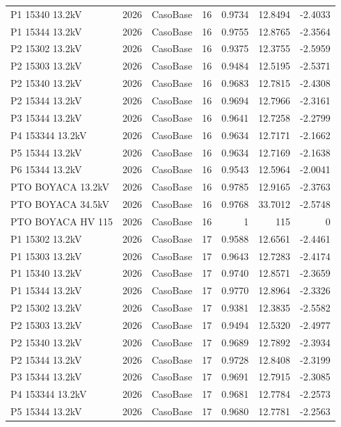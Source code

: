 \documentclass[11pt,a4paper]{article}
\begin{document}
\begin{longtable}{llllrrr}
P1 15340 13.2kV & 2026 & CasoBase & 16 & 0.9734 & 12.8494 & -2.4033 \\
P1 15344 13.2kV & 2026 & CasoBase & 16 & 0.9755 & 12.8765 & -2.3564 \\
P2 15302 13.2kV & 2026 & CasoBase & 16 & 0.9375 & 12.3755 & -2.5959 \\
P2 15303 13.2kV & 2026 & CasoBase & 16 & 0.9484 & 12.5195 & -2.5371 \\
P2 15340 13.2kV & 2026 & CasoBase & 16 & 0.9683 & 12.7815 & -2.4308 \\
P2 15344 13.2kV & 2026 & CasoBase & 16 & 0.9694 & 12.7966 & -2.3161 \\
P3 15344 13.2kV & 2026 & CasoBase & 16 & 0.9641 & 12.7258 & -2.2799 \\
P4 153344 13.2kV & 2026 & CasoBase & 16 & 0.9634 & 12.7171 & -2.1662 \\
P5 15344 13.2kV & 2026 & CasoBase & 16 & 0.9634 & 12.7169 & -2.1638 \\
P6 15344 13.2kV & 2026 & CasoBase & 16 & 0.9543 & 12.5964 & -2.0041 \\
PTO BOYACA 13.2kV & 2026 & CasoBase & 16 & 0.9785 & 12.9165 & -2.3763 \\
PTO BOYACA 34.5kV & 2026 & CasoBase & 16 & 0.9768 & 33.7012 & -2.5748 \\
PTO BOYACA HV 115 & 2026 & CasoBase & 16 & 1 & 115 & 0 \\
P1 15302 13.2kV & 2026 & CasoBase & 17 & 0.9588 & 12.6561 & -2.4461 \\
P1 15303 13.2kV & 2026 & CasoBase & 17 & 0.9643 & 12.7283 & -2.4174 \\
P1 15340 13.2kV & 2026 & CasoBase & 17 & 0.9740 & 12.8571 & -2.3659 \\
P1 15344 13.2kV & 2026 & CasoBase & 17 & 0.9770 & 12.8964 & -2.3326 \\
P2 15302 13.2kV & 2026 & CasoBase & 17 & 0.9381 & 12.3835 & -2.5582 \\
P2 15303 13.2kV & 2026 & CasoBase & 17 & 0.9494 & 12.5320 & -2.4977 \\
P2 15340 13.2kV & 2026 & CasoBase & 17 & 0.9689 & 12.7892 & -2.3934 \\
P2 15344 13.2kV & 2026 & CasoBase & 17 & 0.9728 & 12.8408 & -2.3199 \\
P3 15344 13.2kV & 2026 & CasoBase & 17 & 0.9691 & 12.7915 & -2.3085 \\
P4 153344 13.2kV & 2026 & CasoBase & 17 & 0.9681 & 12.7784 & -2.2573 \\
P5 15344 13.2kV & 2026 & CasoBase & 17 & 0.9680 & 12.7781 & -2.2563 \\

\end{longtable}
\end{document}
